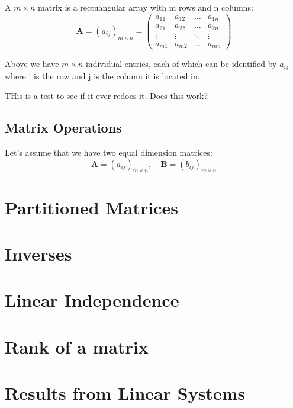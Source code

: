 \documentclass[11pt,fleqn]{book} %
\begin{document}
\begin{definition}
	A $m \times n$ matrix is a rectuangular array with m rows and n columns:
	\begin{equation}
		\mathbf{A} = (a_{ij})_{m \times n} = \begin{pmatrix}
			a_{11} & a_{12} & \dots & a_{1n} \\
			a_{21} & a_{22} & \dots & a_{2n} \\
			\vdots & \vdots &  \ddots & \vdots \\
			a_{m1} & a_{m2} & \dots & a_{mn} 
		\end{pmatrix}
	\end{equation}
\end{definition}

Above we have $m \times n$ individual entries, each of which can be identified by $a_{ij}$ where i is the row and j is the column it is located in. 

THis is a test to see if it ever redoes it. Does this work?

\subsection{Matrix Operations}

Let's assume that we have two equal dimension matrices:
\begin{equation}
	\mathbf{A} = (a_{ij})_{m \times n }, \quad \mathbf{B} = (b_{ij})_{m \times n }
\end{equation}


\section{Partitioned Matrices}

\section{Inverses}

\section{Linear Independence}

\section{Rank of a matrix}

\section{Results from Linear Systems}
\end{document}
